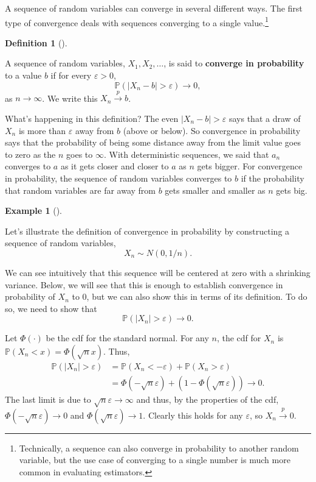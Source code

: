 \documentclass[
  letterpaper,
  DIV=11,
  numbers=noendperiod]{scrreprt}
\renewcommand{\P}{\mathbb{P}}
\newcommand{\inprob}{\overset{p}{\to}}
\theoremstyle{definition}
\newtheorem{example}{Example}[chapter]
\theoremstyle{definition}
\newtheorem{definition}{Definition}[chapter]
\theoremstyle{plain}
\theoremstyle{remark}
\begin{document}
A sequence of random variables can converge in several different ways.
The first type of convergence deals with sequences converging to a
single value.\footnote{Technically, a sequence can also converge in
  probability to another random variable, but the use case of converging
  to a single number is much more common in evaluating estimators.}

\begin{definition}[]\protect\hypertarget{def-inprob}{}\label{def-inprob}

A sequence of random variables, \(X_1, X_2, \ldots\), is said to
\textbf{converge in probability} to a value \(b\) if for every
\(\varepsilon > 0\), \[
\P(|X_n - b| > \varepsilon) \rightarrow 0,
\] as \(n\rightarrow \infty\). We write this \(X_n \inprob b\).

\end{definition}

What's happening in this definition? The even
\(|X_n - b| > \varepsilon\) says that a draw of \(X_n\) is more than
\(\varepsilon\) away from \(b\) (above or below). So convergence in
probability says that the probability of being some distance away from
the limit value goes to zero as the \(n\) goes to \(\infty\). With
deterministic sequences, we said that \(a_n\) converges to \(a\) as it
gets closer and closer to \(a\) as \(n\) gets bigger. For convergence in
probability, the sequence of random variables converges to \(b\) if the
probability that random variables are far away from \(b\) gets smaller
and smaller as \(n\) gets big.

\begin{example}[]\protect\hypertarget{exm-inprob}{}\label{exm-inprob}

Let's illustrate the definition of convergence in probability by
constructing a sequence of random variables, \[
X_n \sim N(0, 1/n).
\]

We can see intuitively that this sequence will be centered at zero with
a shrinking variance. Below, we will see that this is enough to
establish convergence in probability of \(X_n\) to 0, but we can also
show this in terms of its definition. To do so, we need to show that \[
\P(|X_n| > \varepsilon) \to 0.
\]

Let \(\Phi(\cdot)\) be the cdf for the standard normal. For any \(n\),
the cdf for \(X_n\) is \(\P(X_{n} < x) = \Phi(\sqrt{n}x)\). Thus, \[
\begin{aligned}
\P(|X_n| > \varepsilon) &= \P(X_n < -\varepsilon) + \P(X_n > \varepsilon) \\ &= \Phi(-\sqrt{n}\varepsilon) + (1 - \Phi(\sqrt{n}\varepsilon)) \to 0.
\end{aligned}
\] The last limit is due to \(\sqrt{n}\varepsilon \to \infty\) and thus,
by the properties of the cdf, \(\Phi(-\sqrt{n}\varepsilon) \to 0\) and
\(\Phi(\sqrt{n}\varepsilon) \to 1\). Clearly this holds for any
\(\varepsilon\), so \(X_n \inprob 0\).

\end{example}
\end{document}
